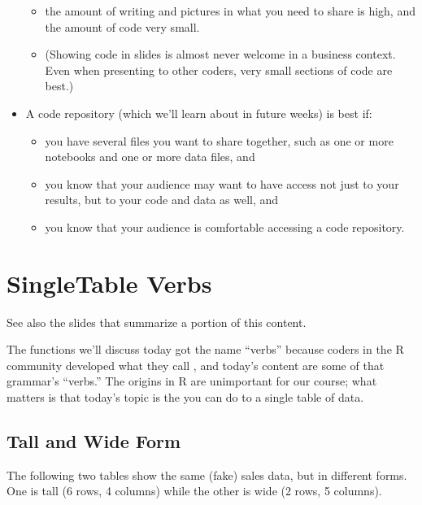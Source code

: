 \documentclass[letterpaper,10pt,english]{jupyterBook}
\begin{document}
\begin{itemize}
\begin{itemize}
\item {} 
\sphinxAtStartPar
the amount of writing and pictures in what you need to share is high, and the amount of code very small.

\item {} 
\sphinxAtStartPar
(Showing code in slides is almost never welcome in a business context.  Even when presenting to other coders, very small sections of code are best.)

\end{itemize}

\item {} 
\sphinxAtStartPar
A code repository (which we’ll learn about in future weeks) is best if:
\begin{itemize}
\item {} 
\sphinxAtStartPar
you have several files you want to share together, such as one or more notebooks and one or more data files, and

\item {} 
\sphinxAtStartPar
you know that your audience may want to have access not just to your results, but to your code and data as well, and

\item {} 
\sphinxAtStartPar
you know that your audience is comfortable accessing a code repository.

\end{itemize}

\end{itemize}


\chapter{Single\sphinxhyphen{}Table Verbs}
\label{\detokenize{chapter-6-single-table-verbs:single-table-verbs}}\label{\detokenize{chapter-6-single-table-verbs::doc}}
\sphinxAtStartPar
See also the slides that summarize a portion of this content.

\sphinxAtStartPar
The functions we’ll discuss today got the name “verbs” because coders in the R community developed what they call , and today’s content are some of that grammar’s “verbs.”  The origins in R are unimportant for our course; what matters is that today’s topic is the  you can do to a single table of data.


\section{Tall and Wide Form}
\label{\detokenize{chapter-6-single-table-verbs:tall-and-wide-form}}
\sphinxAtStartPar
The following two tables show the same (fake) sales data, but in different forms.  One is tall (6 rows, 4 columns) while the other is wide (2 rows, 5 columns).
\end{document}
